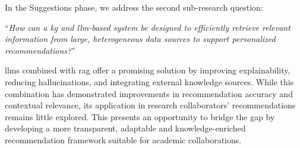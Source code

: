 In the Suggestions phase, we address the second sub-research question:
\begin{center}
    ``\textit{How can a \gls{kg} and \gls{llm}-based system be designed to efficiently retrieve relevant information from large, heterogeneous data sources to support personalized recommendations?}''
\end{center}

\glspl{llm} combined with \gls{rag} offer a promising solution by improving explainability, reducing hallucinations, and integrating external knowledge sources.
While this combination has demonstrated improvements in recommendation accuracy and contextual relevance, its application in research collaborators' recommendations remains little explored.
This presents an opportunity to bridge the gap by developing a more transparent, adaptable and knowledge-enriched recommendation framework suitable for academic collaborations.